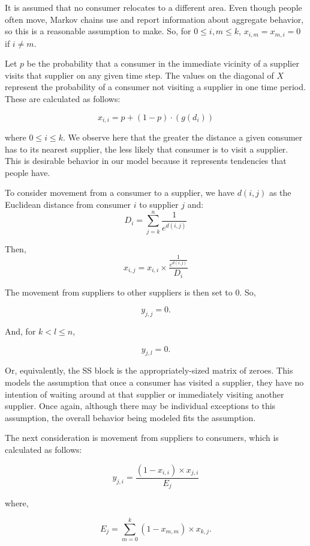 \documentclass[twoside,twocolumn]{article}
\begin{document}
It is assumed that no consumer relocates to a different area.
Even though people often move, Markov chains use and report information about aggregate behavior, so this is a reasonable assumption to make. %
So, for $0 \leq i,m \leq k$, $x_{i,m} = x_{m,i} = 0$ if $i \neq m$.

Let $p$ be the probability that a consumer in the immediate vicinity of a supplier visits that supplier on any given time step.
The values on the diagonal of $X$ represent the probability of a consumer not visiting a supplier in one time period.
These are calculated as follows:

$$x_{i,i} = p + (1-p) \cdot (g(d_{i}))$$

where $0 \leq i \leq k$.
We observe here that the greater the distance a given consumer has to its nearest supplier, the less likely that consumer is to visit a supplier.
This is desirable behavior in our model because it represents tendencies that people have.

To consider movement from a consumer to a supplier, we have $d(i, j)$ as the Euclidean distance from consumer $i$ to supplier $j$ and:
$$D_i = \sum_{j=k}^{n} \frac{1}{e^{d(i,j)}}$$

Then,
$$x_{i,j} = x_{i,i} \times \frac{\frac{1}{e^{d(i,j)}}}{D_i}$$

The movement from suppliers to other suppliers is then set to 0.
So,

$$y_{j,j} = 0.$$

And, for $k < l \leq n$,

$$y_{j,l} = 0.$$

Or, equivalently, the SS block is the appropriately-sized matrix of zeroes.
This models the assumption that once a consumer has visited a supplier, they have no intention of waiting around at that supplier or immediately visiting another supplier.
Once again, although there may be individual exceptions to this assumption, the overall behavior being modeled fits the assumption.

The next consideration is movement from suppliers to consumers, which is calculated as follows:

$$y_{j,i} = \frac{(1-x_{i,i})\times x_{j,i}}{E_j}$$

where, 

$$E_j = \sum_{m=0}^{k} (1-x_{m,m})\times x_{k,j}.$$

\end{document}
